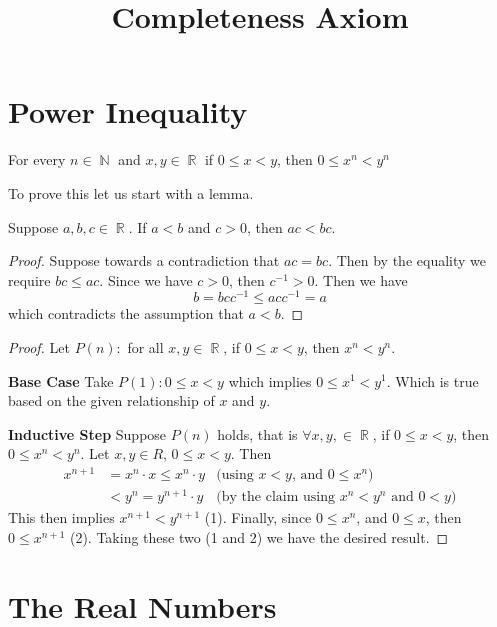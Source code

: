 \documentclass[a4paper, 11pt]{article}
\title{Completeness Axiom}
\DeclareMathOperator{\N}{\mathbb{N}}
\DeclareMathOperator{\R}{\mathbb{R}}
\begin{document}
\tableofcontents

\section{Power Inequality}
\begin{theorem}
For every $n \in \N$ and $x, y \in \R$ if $0 \leq x < y$, then $0 \leq x^{n} < y^{n}$
\end{theorem}

To prove this let us start with a lemma.
\begin{lemma}
Suppose $a, b, c \in \R$. If $a < b$ and $c > 0$, then $ac < bc$.
\end{lemma}
\begin{proof}
Suppose towards a contradiction that $ac = bc$. Then by the equality we require $bc \leq ac$. Since we have $c > 0$, then $c^{-1} > 0$. Then we have
\begin{equation*}
  b = bcc^{-1} \leq acc^{-1} = a
\end{equation*}
which contradicts the assumption that $a < b$.
\end{proof}

\begin{proof}
Let $P(n):$ for all $x, y \in \R$, if $0 \leq x < y$, then $x^{n} < y^{n}$.

\textbf{Base Case}\newline
Take $P(1): 0 \leq x < y$ which implies $0 \leq x^1 < y^1$. Which is true based on the given relationship of $x$ and $y$.

\textbf{Inductive Step}\newline
Suppose $P(n)$ holds, that is $\forall x, y, \in \R$, if $0\leq x < y$, then $0 \leq x^n < y^n$. Let $x, y \in R$, $0\leq x < y$.
Then 
\begin{align*}
  x^{n+1} &= x^n \cdot x \leq x^n \cdot y &\text{(using $x < y$, and $0 \leq x^n$)} \\
  &<y^n = y^{n+1} \cdot y &\text{(by the claim using $x^n < y^n$ and $0 < y$)}
\end{align*}
This then implies $x^{n+1} < y^{n+1}$ (1). Finally, since $0 \leq x^n$, and $0 \leq x$, then $0 \leq x^{n+1}$ (2). Taking these two (1 and 2)
we have the desired result.

\end{proof}

\section{The Real Numbers}
\end{document}
